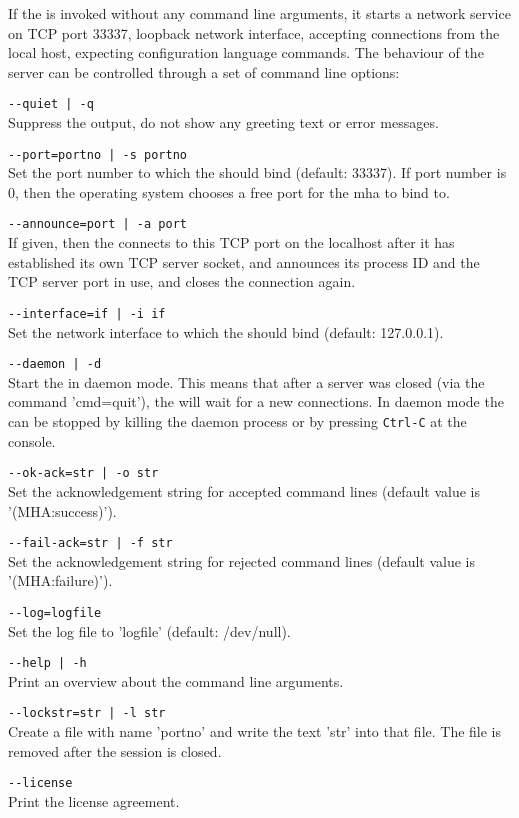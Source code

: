 If the \mhad{} is invoked without any command line arguments, it
starts a network service on TCP port 33337, loopback network interface,
accepting connections from the local host, expecting configuration language
commands.
%
The behaviour of the server can be controlled through a set of command
line options:
%
\begin{description}
\item\verb!--quiet | -q!\\Suppress the output, do not show any
greeting text or error messages.
\item\verb!--port=portno | -s portno!\\Set the port number to which
  the \mhad{} should bind (default: 33337). 
  If port number is 0, 
  then the operating system chooses a free port for the mha to bind to.
\item\verb!--announce=port | -a port!\\ If given, then the \mha{} connects to 
  this TCP port on the localhost after it has established its own TCP server 
  socket, and announces its process ID and the TCP server port in use, and
  closes the connection again. 
\item\verb!--interface=if | -i if!\\Set the network interface to which
the \mhad{} should bind (default: 127.0.0.1).
\item\verb!--daemon | -d!\\Start the \mhad{} in daemon
  mode. This means that after a \mha{} server was closed (via the \mha{}
  command 'cmd=quit'), the \mhad{} will wait for a new
  connections. In daemon mode the \mhad{} can be stopped by killing
  the daemon process or by pressing {\tt Ctrl-C} at the console.
\item\verb!--ok-ack=str | -o str!\\Set the acknowledgement string for
  accepted \mha{} command lines (default value is '(MHA:success)').
\item\verb!--fail-ack=str | -f str!\\Set the acknowledgement string
  for rejected \mha{} command lines (default value is
  '(MHA:failure)').
\item\verb!--log=logfile!\\Set the log file to 'logfile'
  (default: /dev/null).
\item\verb!--help | -h!\\Print an overview about the command line
  arguments.
\item\verb!--lockstr=str | -l str!\\Create a file with name 'portno'
and write the text 'str' into that file. The file is removed after the
\mha{} session is closed.
\item\verb!--license!\\Print the license agreement.
\end{description}

